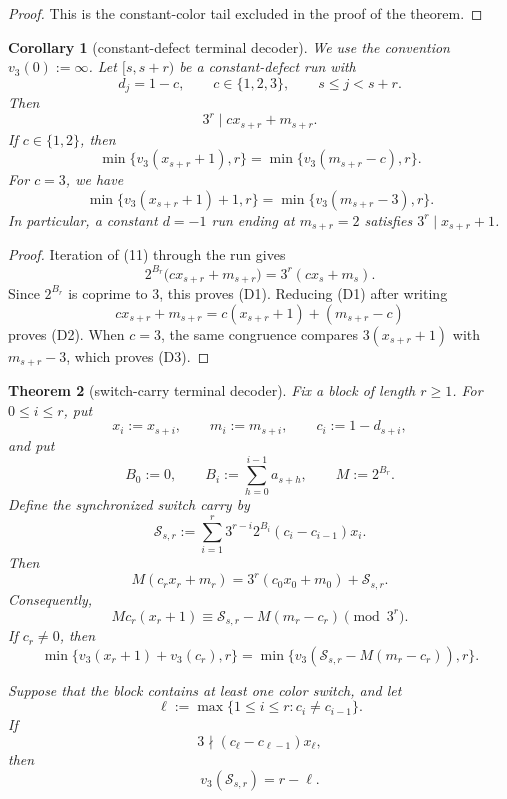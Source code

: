 \documentclass[11pt]{article}
\newtheorem{theorem}{Theorem}
\newtheorem{corollary}[theorem]{Corollary}
\begin{document}
\begin{proof}
This is the constant-color tail excluded in the proof of the theorem.
\end{proof}

\begin{corollary}[constant-defect terminal decoder]
We use the convention $v_3(0):=\infty$.
Let $[s,s+r)$ be a constant-defect run with
\[
  d_j=1-c,
  \qquad c\in\{1,2,3\},
  \qquad s\leq j<s+r.
\]
Then
\[
\boxed{3^r\mid cx_{s+r}+m_{s+r}.}
\tag{D1}
\]
If $c\in\{1,2\}$, then
\[
\boxed{
  \min\{v_3(x_{s+r}+1),r\}
  =\min\{v_3(m_{s+r}-c),r\}.}
\tag{D2}
\]
For $c=3$, we have
\[
\boxed{
  \min\{v_3(x_{s+r}+1)+1,r\}
  =\min\{v_3(m_{s+r}-3),r\}.}
\tag{D3}
\]
In particular, a constant $d=-1$ run ending at $m_{s+r}=2$ satisfies
$3^r\mid x_{s+r}+1$.
\end{corollary}

\begin{proof}
Iteration of (11) through the run gives
\[
  2^{B_r}\bigl(cx_{s+r}+m_{s+r}\bigr)
  =3^r(cx_s+m_s).
\]
Since $2^{B_r}$ is coprime to $3$, this proves (D1).  Reducing (D1) after
writing
\[
  cx_{s+r}+m_{s+r}
  =c(x_{s+r}+1)+(m_{s+r}-c)
\]
proves (D2).  When $c=3$, the same congruence compares
$3(x_{s+r}+1)$ with $m_{s+r}-3$, which proves (D3).
\end{proof}

\begin{theorem}[switch-carry terminal decoder]
Fix a block of length $r\geq1$.  For $0\leq i\leq r$, put
\[
  x_i:=x_{s+i},
  \qquad m_i:=m_{s+i},
  \qquad c_i:=1-d_{s+i},
\]
and put
\[
  B_0:=0,
  \qquad B_i:=\sum_{h=0}^{i-1}a_{s+h},
  \qquad M:=2^{B_r}.
\]
Define the synchronized switch carry by
\[
  \mathscr S_{s,r}
  :=\sum_{i=1}^{r}
  3^{r-i}2^{B_i}(c_i-c_{i-1})x_i.
  \tag{S1}
\]
Then
\[
\boxed{
  M(c_rx_r+m_r)
  =3^r(c_0x_0+m_0)+\mathscr S_{s,r}.}
  \tag{S2}
\]
Consequently,
\[
\boxed{
  Mc_r(x_r+1)
  \equiv
  \mathscr S_{s,r}-M(m_r-c_r)
  \pmod {3^r}.}
  \tag{S3}
\]
If $c_r\neq0$, then
\[
\boxed{
  \min\{v_3(x_r+1)+v_3(c_r),r\}
  =\min\{v_3(\mathscr S_{s,r}-M(m_r-c_r)),r\}.}
  \tag{S4}
\]

Suppose that the block contains at least one color switch, and let
\[
  \ell:=\max\{1\leq i\leq r:c_i\neq c_{i-1}\}.
\]
If
\[
  3\nmid(c_\ell-c_{\ell-1})x_\ell,
  \tag{S5}
\]
then
\[
\boxed{v_3(\mathscr S_{s,r})=r-\ell.}
\tag{S6}
\]
\end{theorem}
\end{document}
